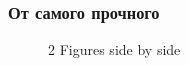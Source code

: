 \documentclass{beamer}
\begin{document}
\begin{frame}
\frametitle{От самого прочного}

\begin{figure}%
    \centering
    \qquad
    \caption{2 Figures side by side}%
    \label{fig:example}%
\end{figure}

\end{frame}
\end{document}
